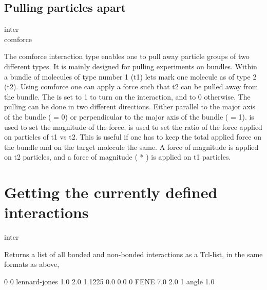\subsection{Pulling particles apart}
\begin{essyntax}
  inter  \\
  comforce   
\end{essyntax}
The comforce interaction type enables one to pull away particle groups
of two different types. It is mainly designed for pulling experiments
on bundles. Within a bundle of molecules of type number 1 (t1) lets
mark one molecule as of type 2 (t2). Using comforce one can apply a
force such that t2 can be pulled away from the bundle. The
 is set to 1 to turn on the interaction, and to 0
otherwise. The pulling can be done in two different directions. Either
parallel to the major axis of the bundle (  = 0) or
perpendicular to the major axis of the bundle ( =
1).  is used to set the magnitude of the force.
 is used to set the ratio of the force applied on
particles of t1 vs t2. This is useful if one has to keep the total
applied force on the bundle and on the target molecule the same. A
force of magnitude  is applied on t2 particles,
and a force of magnitude ( *
) is applied on t1 particles.

\section{Getting the currently defined  interactions}
\begin{essyntax}
  inter
\end{essyntax}
Returns a list of all bonded and non-bonded interactions as a
Tcl-list, in the same formats as above, \eg

\begin{tclcode}
{0 0 lennard-jones 1.0 2.0 1.1225 0.0 0.0} {0 FENE 7.0 2.0} {1 angle
 1.0}
\end{tclcode}



